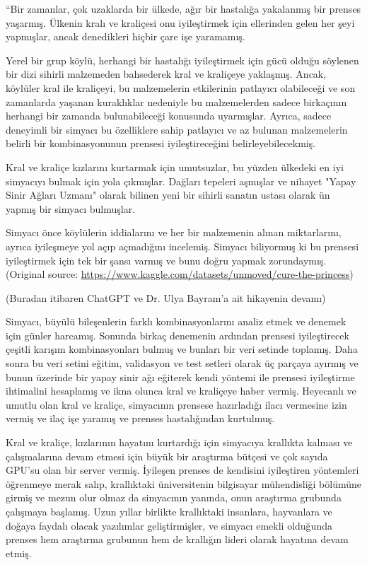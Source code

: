 \documentclass[11pt]{article}
\begin{document}
``Bir zamanlar, çok uzaklarda bir ülkede, ağır bir hastalığa yakalanmış bir prenses yaşarmış. Ülkenin kralı ve kraliçesi onu iyileştirmek için ellerinden gelen her şeyi yapmışlar, ancak denedikleri hiçbir çare işe yaramamış.

Yerel bir grup köylü, herhangi bir hastalığı iyileştirmek için gücü olduğu söylenen bir dizi sihirli malzemeden bahsederek kral ve kraliçeye yaklaşmış. Ancak, köylüler kral ile kraliçeyi, bu malzemelerin etkilerinin patlayıcı olabileceği ve son zamanlarda yaşanan kuraklıklar nedeniyle bu malzemelerden sadece birkaçının herhangi bir zamanda bulunabileceği konusunda uyarmışlar. Ayrıca, sadece deneyimli bir simyacı bu özelliklere sahip patlayıcı ve az bulunan malzemelerin belirli bir kombinasyonunun prensesi iyileştireceğini belirleyebilecekmiş.

Kral ve kraliçe kızlarını kurtarmak için umutsuzlar, bu yüzden ülkedeki en iyi simyacıyı bulmak için yola çıkmışlar. Dağları tepeleri aşmışlar ve nihayet "Yapay Sinir Ağları Uzmanı" olarak bilinen yeni bir sihirli sanatın ustası olarak ün yapmış bir simyacı bulmuşlar.

Simyacı önce köylülerin iddialarını ve her bir malzemenin alınan miktarlarını, ayrıca iyileşmeye yol açıp açmadığını incelemiş. Simyacı biliyormuş ki bu prensesi iyileştirmek için tek bir şansı varmış ve bunu doğru yapmak zorundaymış. (Original source: \url{https://www.kaggle.com/datasets/unmoved/cure-the-princess})

(Buradan itibaren ChatGPT ve Dr. Ulya Bayram'a ait hikayenin devamı)

Simyacı, büyülü bileşenlerin farklı kombinasyonlarını analiz etmek ve denemek için günler harcamış. Sonunda birkaç denemenin ardından prensesi iyileştirecek çeşitli karışım kombinasyonları bulmuş ve bunları bir veri setinde toplamış. Daha sonra bu veri setini eğitim, validasyon ve test setleri olarak üç parçaya ayırmış ve bunun üzerinde bir yapay sinir ağı eğiterek kendi yöntemi ile prensesi iyileştirme ihtimalini hesaplamış ve ikna olunca kral ve kraliçeye haber vermiş. Heyecanlı ve umutlu olan kral ve kraliçe, simyacının prensese hazırladığı ilacı vermesine izin vermiş ve ilaç işe yaramış ve prenses hastalığından kurtulmuş.

Kral ve kraliçe, kızlarının hayatını kurtardığı için simyacıya krallıkta kalması ve çalışmalarına devam etmesi için büyük bir araştırma bütçesi ve çok sayıda GPU'su olan bir server vermiş. İyileşen prenses de kendisini iyileştiren yöntemleri öğrenmeye merak salıp, krallıktaki üniversitenin bilgisayar mühendisliği bölümüne girmiş ve mezun olur olmaz da simyacının yanında, onun araştırma grubunda çalışmaya başlamış. Uzun yıllar birlikte krallıktaki insanlara, hayvanlara ve doğaya faydalı olacak yazılımlar geliştirmişler, ve simyacı emekli olduğunda prenses hem araştırma grubunun hem de krallığın lideri olarak hayatına devam etmiş.
\end{document}
